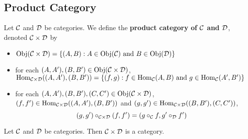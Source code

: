 \documentclass{book}
\begin{document}
	
	\subsection{Product Category}
	
	\begin{defn}
		Let $\mathcal{C}$ and $\mathcal{D}$ be categories. We define the \textbf{product category of $\mathcal{C}$ and $\mathcal{D}$}, denoted $\mathcal{C} \times \mathcal{D}$ by 
		\begin{itemize}
			\item $\operatorname{Obj}(\mathcal{C} \times \mathcal{D}) = \{(A, B): A \in \operatorname{Obj}(\mathcal{C}) \text{ and } B \in \operatorname{Obj}(\mathcal{D})\}$
			\item for each $(A, A'), (B, B') \in \operatorname{Obj}(\mathcal{C} \times \mathcal{D})$, $\operatorname{Hom}_{\mathcal{C} \times \mathcal{D}}((A, A'), (B, B')) = \{(f,g): f \in \operatorname{Hom}_{\mathcal{C}}(A, B) \text{ and }  g \in \operatorname{Hom}_{\mathcal{C}}(A', B') \}$
			\item for each  $(A, A'), (B, B'), (C, C') \in \operatorname{Obj}(\mathcal{C} \times \mathcal{D})$, $(f, f') \in \operatorname{Hom}_{\mathcal{C} \times \mathcal{D}}((A, A'), (B, B'))$ and $(g, g') \in \operatorname{Hom}_{\mathcal{C} \times \mathcal{D}}((B, B'), (C, C'))$, 
			$$(g,g') \circ_{\mathcal{C} \times \mathcal{D}} (f, f') = (g \circ_{\mathcal{C}} f, g' \circ_{\mathcal{D}} f')$$
		\end{itemize}
	\end{defn}
	
	\begin{ex}
		Let $\mathcal{C}$ and $\mathcal{D}$ be categories. Then $\mathcal{C} \times \mathcal{D}$ is a category. 
	\end{ex}
	
\end{document}
